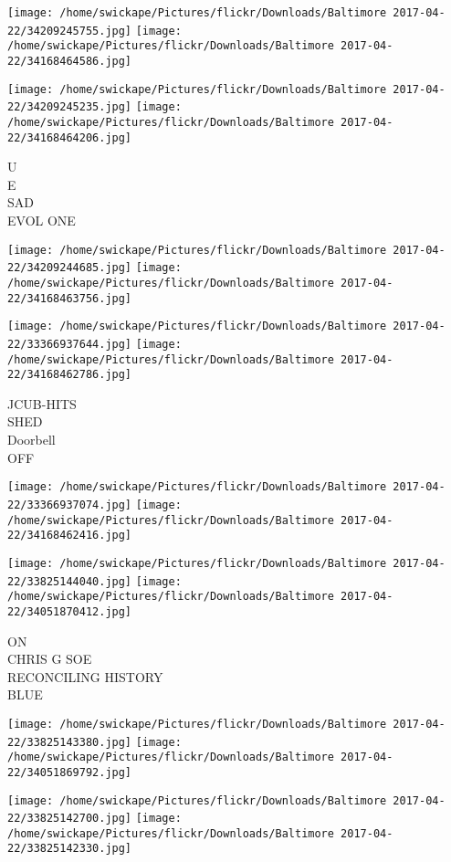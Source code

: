 \documentclass[10pt,letterpaper]{article}
\begin{document}
\texttt{[image: /home/swickape/Pictures/flickr/Downloads/Baltimore 2017-04-22/34209245755.jpg]}
\texttt{[image: /home/swickape/Pictures/flickr/Downloads/Baltimore 2017-04-22/34168464586.jpg]}

\texttt{[image: /home/swickape/Pictures/flickr/Downloads/Baltimore 2017-04-22/34209245235.jpg]}
\texttt{[image: /home/swickape/Pictures/flickr/Downloads/Baltimore 2017-04-22/34168464206.jpg]}

U\\
E\\
SAD\\
EVOL ONE
\pagebreak

\texttt{[image: /home/swickape/Pictures/flickr/Downloads/Baltimore 2017-04-22/34209244685.jpg]}
\texttt{[image: /home/swickape/Pictures/flickr/Downloads/Baltimore 2017-04-22/34168463756.jpg]}

\texttt{[image: /home/swickape/Pictures/flickr/Downloads/Baltimore 2017-04-22/33366937644.jpg]}
\texttt{[image: /home/swickape/Pictures/flickr/Downloads/Baltimore 2017-04-22/34168462786.jpg]}

JCUB{-}HITS\\
SHED\\
Doorbell\\
OFF
\pagebreak

\texttt{[image: /home/swickape/Pictures/flickr/Downloads/Baltimore 2017-04-22/33366937074.jpg]}
\texttt{[image: /home/swickape/Pictures/flickr/Downloads/Baltimore 2017-04-22/34168462416.jpg]}

\texttt{[image: /home/swickape/Pictures/flickr/Downloads/Baltimore 2017-04-22/33825144040.jpg]}
\texttt{[image: /home/swickape/Pictures/flickr/Downloads/Baltimore 2017-04-22/34051870412.jpg]}

ON\\
CHRIS G SOE\\
RECONCILING HISTORY\\
BLUE
\pagebreak

\texttt{[image: /home/swickape/Pictures/flickr/Downloads/Baltimore 2017-04-22/33825143380.jpg]}
\texttt{[image: /home/swickape/Pictures/flickr/Downloads/Baltimore 2017-04-22/34051869792.jpg]}

\texttt{[image: /home/swickape/Pictures/flickr/Downloads/Baltimore 2017-04-22/33825142700.jpg]}
\texttt{[image: /home/swickape/Pictures/flickr/Downloads/Baltimore 2017-04-22/33825142330.jpg]}
\end{document}
